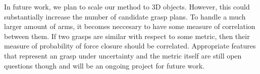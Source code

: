 \documentclass[10pt, conference]{ieeeconf}      %
\begin{document}
In future work, we plan to scale our method to 3D objects. However, this could substantially increase the number of candidate grasp plans. To handle a much larger amount of arms, it becomes neccesary to have some measure of correlation between them. If two grasps are similar with respect to some metric, then their measure of probability of force closure should be correlated. Appropriate features that represent an grasp under uncertainty  and the metric itself are still open questions though and will be an ongoing project for future work. 


\end{document}

